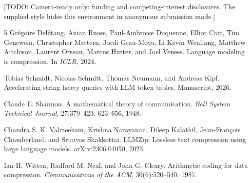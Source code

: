 \documentclass{article}
\newcommand{\todo}[1]{\textcolor{blueprint}{[TODO: #1]}}
\begin{document}
\begin{ack}
\todo{Camera-ready only: funding and competing-interest disclosures. The supplied
style hides this environment in anonymous submission mode.}
\end{ack}

{\small
\begin{thebibliography}{5}
Grégoire Delétang, Anian Ruoss, Paul-Ambroise Duquenne, Elliot Catt, Tim
Genewein, Christopher Mattern, Jordi Grau-Moya, Li Kevin Wenliang, Matthew
Aitchison, Laurent Orseau, Marcus Hutter, and Joel Veness.
\newblock Language modeling is compression.
\newblock In \emph{ICLR}, 2024.

Tobias Schmidt, Nicolas Schmitt, Thomas Neumann, and Andreas Kipf.
\newblock Accelerating string-heavy queries with LLM token tables.
\newblock Manuscript, 2026.

Claude E. Shannon.
\newblock A mathematical theory of communication.
\newblock \emph{Bell System Technical Journal}, 27:379--423, 623--656, 1948.

Chandra S. K. Valmeekam, Krishna Narayanan, Dileep Kalathil,
Jean-François Chamberland, and Srinivas Shakkottai.
\newblock LLMZip: Lossless text compression using large language models.
\newblock arXiv:2306.04050, 2023.

Ian H. Witten, Radford M. Neal, and John G. Cleary.
\newblock Arithmetic coding for data compression.
\newblock \emph{Communications of the ACM}, 30(6):520--540, 1987.
\end{thebibliography}
}


\newpage

\end{document}
